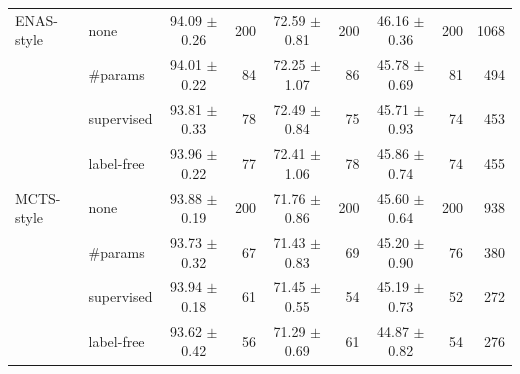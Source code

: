 \begin{tabular}{@{}llcrcrcrr@{}}
\midrule
ENAS-style & none & 94.09 $\pm$ 0.26 & 200 & 72.59 $\pm$ 0.81 & 200 & 46.16 $\pm$ 0.36 & 200 & 1068\\
 & \#params & 94.01 $\pm$ 0.22 & 84 & 72.25 $\pm$ 1.07 & 86 & 45.78 $\pm$ 0.69 & 81 & 494\\
 & supervised & 93.81 $\pm$ 0.33 & 78 & 72.49 $\pm$ 0.84 & 75 & 45.71 $\pm$ 0.93 & 74 & 453\\
 & label-free & 93.96 $\pm$ 0.22 & 77 & 72.41 $\pm$ 1.06 & 78 & 45.86 $\pm$ 0.74 & 74 & 455\\
\midrule
MCTS-style & none & 93.88 $\pm$ 0.19 & 200 & 71.76 $\pm$ 0.86 & 200 & 45.60 $\pm$ 0.64 & 200 & 938\\
 & \#params & 93.73 $\pm$ 0.32 & 67 & 71.43 $\pm$ 0.83 & 69 & 45.20 $\pm$ 0.90 & 76 & 380\\
 & supervised & 93.94 $\pm$ 0.18 & 61 & 71.45 $\pm$ 0.55 & 54 & 45.19 $\pm$ 0.73 & 52 & 272\\
 & label-free & 93.62 $\pm$ 0.42 & 56 & 71.29 $\pm$ 0.69 & 61 & 44.87 $\pm$ 0.82 & 54 & 276\\
\bottomrule
\end{tabular}

